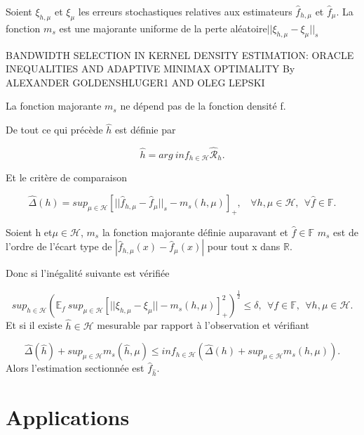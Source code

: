 \documentclass[
]{book}
\begin{document}
\begin{prop}
Soient $\xi_{h,\mu}$ et $\xi_\mu$ les erreurs stochastiques relatives aux estimateurs $\hat f_{h,\mu}$ et $\hat f_\mu$.\newline
La fonction $m_s$ est une majorante uniforme de la perte aléatoire$||\xi_{h,\mu}-\xi_\mu||_s$
\end{prop}
\begin{demo}
BANDWIDTH SELECTION IN KERNEL DENSITY ESTIMATION:
ORACLE INEQUALITIES AND ADAPTIVE MINIMAX
OPTIMALITY By ALEXANDER GOLDENSHLUGER1 AND OLEG LEPSKI
\end{demo}

\begin{rem}
La fonction majorante $m_s$ ne dépend pas de la fonction densité f.
\end{rem}

De tout ce qui précède \(\hat h\) est définie par\newline

\[
\hat h = arg~inf_{h \in \mathcal{H}} \mathcal{\hat R}_h.
\]

Et le critère de comparaison

\[
\hat{\Delta}(h)= sup_{\mu \in \mathcal{H}}[||\hat f_{h,\mu}-\hat f_\mu||_s - m_s(h,\mu)]_+,~~~~\forall h,\mu \in \mathcal H,~~\forall \hat f \in \mathbb F.
\]

\begin{rem}
Soient h et$\mu \in \mathcal H$, $m_s$ la fonction majorante définie auparavant et $\hat f \in \mathbb F$
$m_s$ est de l'ordre de l'écart type de $|\hat f_{h,\mu}(x)-\hat f_\mu(x)|$ pour tout x dans $\mathbb R$.
\end{rem}

Donc si l'inégalité suivante est vérifiée

\[
sup_{h \in \mathcal{H}}(\mathbb{E}_f~sup_{\mu \in \mathcal H}[||\xi_{h,\mu}-\xi_\mu || - m_s(h,\mu)]_+^2)^{\frac{1}{2}} \leq \delta,~~\forall f \in \mathbb{F}, ~~\forall h,\mu \in \mathcal H.
\]
Et si il existe \(\hat h \in \mathcal{H}\) mesurable par rapport à l'observation et vérifiant

\[
\hat{\Delta}(\hat h)+sup_{\mu \in \mathcal H}m_s(\hat h, \mu) \leq inf_{h \in \mathcal H}(\hat \Delta(h) +sup_{\mu \in \mathcal H}m_s(h,\mu)).
\]
Alors l'estimation sectionnée est \(\hat f_{\hat h}\).

\hypertarget{applications}{%
\chapter{Applications}\label{applications}}
\end{document}
